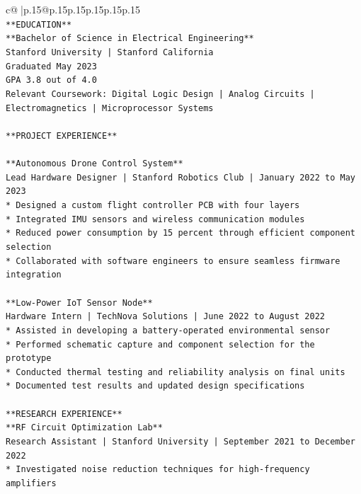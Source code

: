 \documentclass{article}
\begin{document}
{\begin{supertabular}{c@{$\;$}|p{.15\linewidth}@{}p{.15\linewidth}p{.15\linewidth}p{.15\linewidth}p{.15\linewidth}p{.15\linewidth}}
{{{\\ 
\texttt{**EDUCATION**} \\
\texttt{**Bachelor of Science in Electrical Engineering**} \\
\texttt{Stanford University | Stanford California} \\
\texttt{Graduated May 2023} \\
\texttt{GPA 3.8 out of 4.0} \\
\texttt{Relevant Coursework: Digital Logic Design | Analog Circuits | Electromagnetics | Microprocessor Systems} \\
\\ 
\texttt{**PROJECT EXPERIENCE**} \\
\\ 
\texttt{**Autonomous Drone Control System**} \\
\texttt{Lead Hardware Designer | Stanford Robotics Club | January 2022 to May 2023} \\
\texttt{*   Designed a custom flight controller PCB with four layers} \\
\texttt{*   Integrated IMU sensors and wireless communication modules} \\
\texttt{*   Reduced power consumption by 15 percent through efficient component selection} \\
\texttt{*   Collaborated with software engineers to ensure seamless firmware integration} \\
\\ 
\texttt{**Low{-}Power IoT Sensor Node**} \\
\texttt{Hardware Intern | TechNova Solutions | June 2022 to August 2022} \\
\texttt{*   Assisted in developing a battery{-}operated environmental sensor} \\
\texttt{*   Performed schematic capture and component selection for the prototype} \\
\texttt{*   Conducted thermal testing and reliability analysis on final units} \\
\texttt{*   Documented test results and updated design specifications} \\
\\ 
\texttt{**RESEARCH EXPERIENCE**} \\
\texttt{**RF Circuit Optimization Lab**} \\
\texttt{Research Assistant | Stanford University | September 2021 to December 2022} \\
\texttt{*   Investigated noise reduction techniques for high{-}frequency amplifiers} \\
}}}
\end{supertabular}}
\end{document}
